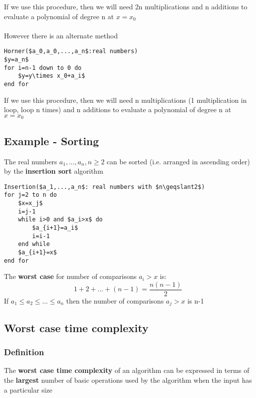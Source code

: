 \documentclass{article}[18pt]
\begin{document}
If we use this procedure, then we will need 2n multiplications and n additions to evaluate a polynomial of degree n at $x=x_0$\\
\\
However there is an alternate method
\begin{lstlisting}
Horner($a_0,a_0,...,a_n$:real numbers)
$y=a_n$
for i=n-1 down to 0 do
	$y=y\times x_0+a_i$
end for
\end{lstlisting}
If we use this procedure, then we will need n multiplications (1 multiplication in loop, loop n times) and n additions to evaluate a polynomial of degree n at $x=x_0$
\subsection{Example - Sorting}
The real numbers $a_1,...,a_n, n\geqslant 2$ can be sorted (i.e. arranged in ascending order) by the \textbf{insertion sort} algorithm
\begin{lstlisting}
Insertion($a_1,...,a_n$: real numbers with $n\geqslant2$)
for j=2 to n do
	$x=x_j$
	i=j-1
	while i>0 and $a_i>x$ do
		$a_{i+1}=a_i$
		i=i-1
	end while
	$a_{i+1}=x$
end for
\end{lstlisting}
The \textbf{worst case} for number of comparisons $a_i>x$ is:
$$1 + 2 + \ldots + ( n - 1 ) = \frac { n ( n - 1 ) } { 2 }$$
If $a_1\leqslant a_2\leqslant...\leqslant a_n$ then the number of comparisons $a_j>x$ is n-1
\subsection{Worst case time complexity}
\subsubsection{Definition}
The \textbf{worst case time complexity} of an algorithm can be expressed in terms of the \textbf{largest} number of basic operations used by the algorithm when the input has a particular size
\end{document}
